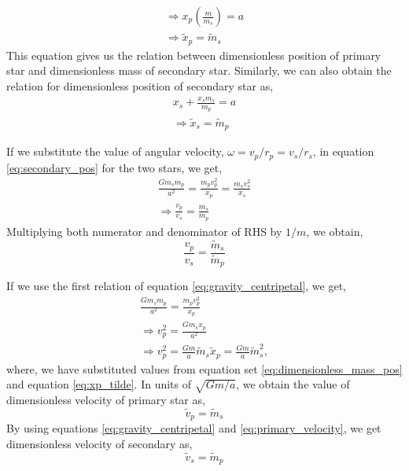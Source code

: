 \documentclass[a4paper]{article}
\begin{document}
\begin{enumerate} [label*=\textbf{(\alph*)}]
\begin{equation}
\begin{gathered}
						\Rightarrow x_p \left( \frac{m}{m_s}\right) = a \\
						\Rightarrow \tilde{x}_p = \tilde{m}_s 
					\end{gathered}
					\label{eq:xp_tilde}
				\end{equation}
				This equation gives us the relation between dimensionless position of primary star and dimensionless mass of secondary star. Similarly, we can also obtain the relation for dimensionless position of secondary star as,
				\begin{equation}
					\begin{gathered}
						x_s + \frac{x_s m_s}{m_p} = a \\
						\Rightarrow \tilde{x}_s = \tilde{m}_p
					\end{gathered}
					\label{eq:xs_tilde}
				\end{equation}
				
				If we substitute the value of angular velocity, \(\omega =  v_p/r_p = v_s/r_s\), in equation \ref{eq:secondary_pos} for the two stars, we get,
				\begin{equation}
					\begin{gathered}
						\frac{G m_s m_p}{a^2} = \frac{m_p v_p^2}{x_p} = \frac{m_s v_s^2}{x_s} \\
						\Rightarrow \frac{v_p}{v_s} = \frac{m_s}{m_p}
					\end{gathered}
					\label{eq:gravity_centripetal}
				\end{equation}
				Multiplying both numerator and denominator of RHS by \(1/m\), we obtain,
				\begin{equation}
					\frac{v_p}{v_s} = \frac{\tilde{m}_s}{\tilde{m}_p}
					\label{eq:velocity_mass_relation}
				\end{equation}
				
				If we use the first relation of equation \ref{eq:gravity_centripetal}, we get,
				\begin{equation}
					\begin{gathered}
						\frac{G m_s m_p}{a^2} = \frac{m_p v_p^2}{x_p} \\
						\Rightarrow v_p^2 = \frac{G m_s x_p}{a^2} \\
						\Rightarrow v_p^2 = \frac{Gm}{a} \tilde{m}_s \tilde{x}_p = \frac{Gm}{a} \tilde{m}_s^2,
					\end{gathered}
				\end{equation}
				where, we have substituted values from equation set \ref{eq:dimensionless_mass_pos} and equation \ref{eq:xp_tilde}. In units of \(\sqrt{Gm/a}\), we obtain the value of dimensionless velocity of primary star as,
					\begin{equation}
						\tilde{v}_p = \tilde{m}_s
						\label{eq:primary_velocity}
					\end{equation}
				By using equations \ref{eq:gravity_centripetal} and \ref{eq:primary_velocity}, we get dimensionless velocity of secondary as,
					\begin{equation}
						\tilde{v}_s = \tilde{m}_p
						\label{eq:secondary_velocity}
					\end{equation}
				

\end{enumerate}
\end{document}
